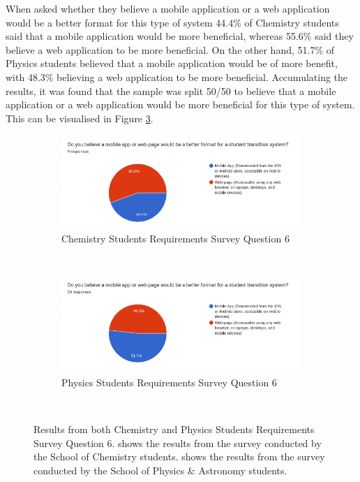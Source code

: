 \documentclass{l4proj}
\begin{document}
When asked whether they believe a mobile application or a web application would be a better format for this type of system 44.4\% of Chemistry students said that a mobile application would be more beneficial,  whereas 55.6\% said they believe a web application to be more beneficial. On the other hand,  51.7\% of Physics students believed that a mobile application would be of more benefit,  with 48.3\% believing a web application to be more beneficial. Accumulating the results,  it was found that the sample was split 50/50 to believe that a mobile application or a web application would be more beneficial for this type of system. This can be visualised in Figure \ref{fig:format}.

\begin{figure}[h]
    \centering
    \begin{subfigure}[b]{0.7\textwidth}
        \includegraphics[width=\textwidth]{images/chemistry_format_results.pdf}
        \caption{Chemistry Students Requirements Survey Question 6}
        \label{fig:syn1}
    \end{subfigure}
    ~ %
    \begin{subfigure}[b]{0.7\textwidth}
        \includegraphics[width=\textwidth]{images/physics_format_results.pdf}
        \caption{Physics Students Requirements Survey Question 6}
        \label{fig:syn2}
    \end{subfigure}
    ~ %
    \caption{Results from both Chemistry and Physics Students Requirements Survey Question 6.  shows the results from the survey conducted by the School of Chemistry students.  shows the results from the survey conducted by the School of Physics \& Astronomy students.
    }\label{fig:format}
\end{figure}
\end{document}
